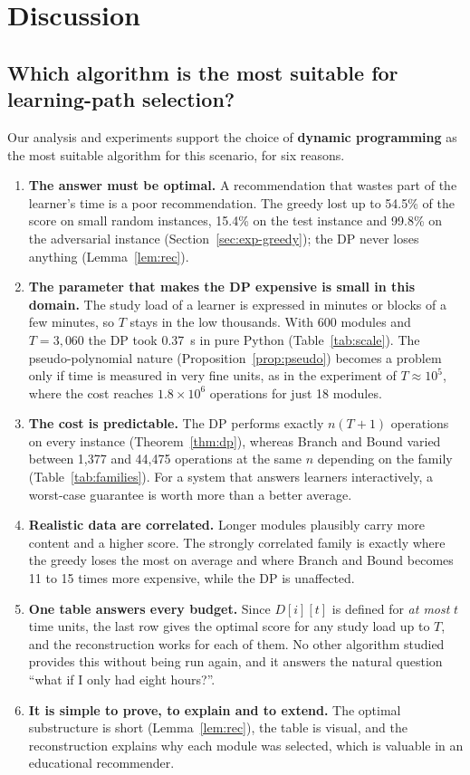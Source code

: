 \section{Discussion}\label{sec:discussion}

\subsection{Which algorithm is the most suitable for learning-path selection?}

Our analysis and experiments support the choice of \textbf{dynamic programming} as the most suitable algorithm for this scenario, for six reasons.

\begin{enumerate}[leftmargin=1.6em,itemsep=3pt]
\item \textbf{The answer must be optimal.} A recommendation that wastes part of the learner's time is a poor recommendation. The greedy lost up to 54.5\% of the score on small random instances, 15.4\% on the test instance and 99.8\% on the adversarial instance (Section~\ref{sec:exp-greedy}); the DP never loses anything (Lemma~\ref{lem:rec}).
\item \textbf{The parameter that makes the DP expensive is small in this domain.} The study load of a learner is expressed in minutes or blocks of a few minutes, so $T$ stays in the low thousands. With 600 modules and $T=3{,}060$ the DP took 0.37~s in pure Python (Table~\ref{tab:scale}). The pseudo-polynomial nature (Proposition~\ref{prop:pseudo}) becomes a problem only if time is measured in very fine units, as in the experiment of $T\approx10^5$, where the cost reaches $1.8\times10^6$ operations for just 18 modules.
\item \textbf{The cost is predictable.} The DP performs exactly $n(T+1)$ operations on every instance (Theorem~\ref{thm:dp}), whereas Branch and Bound varied between 1,377 and 44,475 operations at the same $n$ depending on the family (Table~\ref{tab:families}). For a system that answers learners interactively, a worst-case guarantee is worth more than a better average.
\item \textbf{Realistic data are correlated.} Longer modules plausibly carry more content and a higher score. The strongly correlated family is exactly where the greedy loses the most on average and where Branch and Bound becomes 11 to 15 times more expensive, while the DP is unaffected.
\item \textbf{One table answers every budget.} Since $D[i][t]$ is defined for \emph{at most} $t$ time units, the last row gives the optimal score for any study load up to $T$, and the reconstruction works for each of them. No other algorithm studied provides this without being run again, and it answers the natural question ``what if I only had eight hours?''.
\item \textbf{It is simple to prove, to explain and to extend.} The optimal substructure is short (Lemma~\ref{lem:rec}), the table is visual, and the reconstruction explains why each module was selected, which is valuable in an educational recommender.
\end{enumerate}

